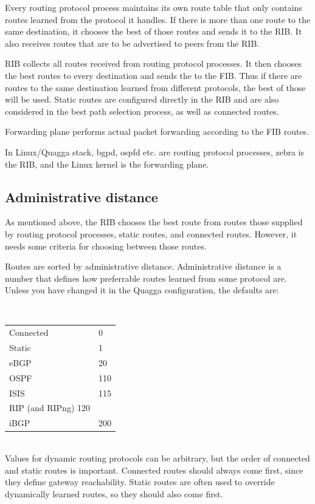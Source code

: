 Every routing protocol process maintains its own route table that only contains routes learned
from the protocol it handles. If there is more than one route to the same destination, it
chooses the best of those routes and sends it to the RIB. It also receives routes that
are to be advertised to peers from the RIB.

RIB collects all routes received from routing protocol processes. It then chooses the best
routes to every destination and sends the to the FIB. Thus if there are routes to the same
destination learned from different protocols, the best of those will be used. Static routes
are configured directly in the RIB and are also considered in the best path selection process,
as well as connected routes.

Forwarding plane performs actual packet forwarding according to the FIB routes.

In Linux/Quagga stack, bgpd, ospfd etc. are routing protocol processes, zebra is the RIB,
and the Linux kernel is the forwarding plane.

\subsection{Administrative distance}

As mentioned above, the RIB chooses the best route from routes those supplied by routing 
protocol processes, static routes, and connected routes. However, it needs some criteria
for choosing between those routes.

Routes are sorted by administrative distance. Administrative distance is a number that
defines how preferrable routes learned from some protocol are. Unless you have changed it
in the Quagga configuration, the defaults are:

\ \\

\noindent{}\begin{tabular}{ll}
\hline
Connected & 0 \\
Static & 1 \\
eBGP & 20 \\
OSPF & 110 \\
ISIS & 115 \\
RIP (and RIPng) 120 \\
iBGP & 200 \\
\hline
\end{tabular}

\ \\

Values for dynamic routing protocols can be arbitrary, but the order of connected
and static routes is important. Connected routes should always come first, since
they define gateway reachability. Static routes are often used to override dynamically
learned routes, so they should also come first.
